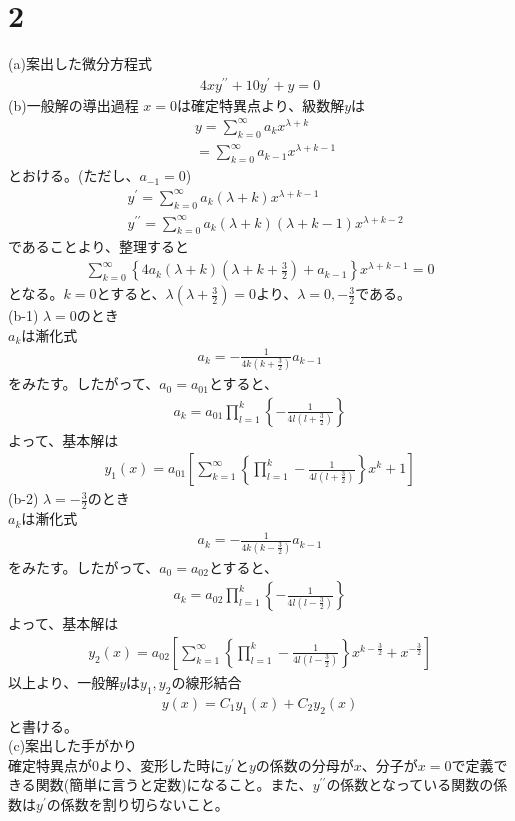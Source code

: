 \documentclass[pdflatex,ja=standard,fleqn]{bxjsarticle}
\begin{document}
\section*{2}
(a)案出した微分方程式
\begin{eqnarray*}
    4xy^{\prime\prime}+10y^{\prime}+y=0
\end{eqnarray*}
(b)一般解の導出過程
$x=0$は確定特異点より、級数解$y$は
\begin{align*}
    & y=\sum_{k=0}^{\infty}a_{k}x^{\lambda+k}\\
    & =\sum_{k=0}^{\infty}a_{k-1}x^{\lambda+k-1}
\end{align*}
とおける。(ただし、$a_{-1}=0$)
\begin{align*}
    & y^{\prime}=\sum_{k=0}^{\infty}a_{k}(\lambda+k)x^{\lambda+k-1} \\
    & y^{\prime\prime}=\sum_{k=0}^{\infty}a_{k}(\lambda+k)(\lambda+k-1)x^{\lambda+k-2}
\end{align*}
であることより、整理すると
\begin{eqnarray*}
    \sum_{k=0}^{\infty}\left\{4a_{k}(\lambda+k)(\lambda+k+\frac{3}{2})+a_{k-1}\right\}x^{\lambda+k-1}=0
\end{eqnarray*}
となる。$k=0$とすると、$\lambda(\lambda+\frac{3}{2})=0$より、$\lambda=0, -\frac{3}{2}$である。\\
(b-1) $\lambda=0$のとき\\
$a_{k}$は漸化式
\begin{eqnarray*}
    a_{k}=-\frac{1}{4k(k+\frac{3}{2})}a_{k-1}
\end{eqnarray*}
をみたす。したがって、$a_{0}=a_{01}$とすると、
\begin{eqnarray*}
    a_{k} = a_{01}\prod_{l=1}^{k}\left\{-\frac{1}{4l(l+\frac{3}{2})}\right\}
\end{eqnarray*}
よって、基本解は
\begin{eqnarray*}
    y_{1}(x)=a_{01}\left[\sum_{k=1}^{\infty}\left\{\prod_{l=1}^{k}-\frac{1}{4l(l+\frac{3}{2})}\right\}x^{k}+1\right]
\end{eqnarray*}
(b-2) $\lambda=-\frac{3}{2}$のとき\\
$a_{k}$は漸化式
\begin{eqnarray*}
    a_{k}=-\frac{1}{4k(k-\frac{3}{2})}a_{k-1}
\end{eqnarray*}
をみたす。したがって、$a_{0}=a_{02}$とすると、
\begin{eqnarray*}
    a_{k} = a_{02}\prod_{l=1}^{k}\left\{-\frac{1}{4l(l-\frac{3}{2})}\right\}
\end{eqnarray*}
よって、基本解は
\begin{eqnarray*}
    y_{2}(x)=a_{02}\left[\sum_{k=1}^{\infty}\left\{\prod_{l=1}^{k}-\frac{1}{4l(l-\frac{3}{2})}\right\}x^{k-\frac{3}{2}}+x^{-\frac{3}{2}}\right]
\end{eqnarray*}
以上より、一般解$y$は$y_{1},y_{2}$の線形結合
\begin{eqnarray*}
    y(x)=C_{1}y_{1}(x)+C_{2}y_{2}(x)
\end{eqnarray*}
と書ける。\\
(c)案出した手がかり\\
確定特異点が0より、変形した時に$y^{\prime}$と$y$の係数の分母が$x$、分子が$x=0$で定義できる関数(簡単に言うと定数)になること。また、$y^{\prime\prime}$の係数となっている関数の係数は$y^{\prime}$の係数を割り切らないこと。
\end{document}

